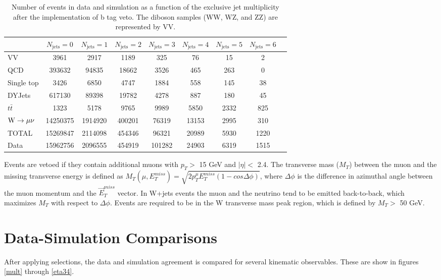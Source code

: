 \documentclass[oneside, letterpaper, oldfontcommands]{memoir}
\begin{document}
\begin{table}\small
\centering
\caption{Number of events in data and simulation as a function of the exclusive jet multiplicity after the implementation of b tag veto. The diboson samples (WW, WZ, and ZZ) are represented by VV.}
\footnotesize{
\begin{tabular}{l|cccccccc}
  &  $N_{\text{jets}} = 0 $ & $N_{\text{jets}} = 1 $ & $N_{\text{jets}} = 2 $ & $N_{\text{jets}} = 3 $ & $N_{\text{jets}} = 4 $ & $N_{\text{jets}} = 5 $ & $N_{\text{jets}} = 6 $ \\ \hline
   VV        & 3961 & 2917 & 1189 & 325 & 76 & 15 & 2 \\
   QCD        & 393632 & 94835 & 18662 & 3526 & 465 & 263 & 0 \\
   Single top        & 3426 & 6850 & 4747 & 1884 & 558 & 145 & 38 \\
   DYJets        & 617130 & 89398 & 19782 & 4278 & 887 & 180 & 45 \\
   $t\bar{t}$         & 1323 & 5178 & 9765 & 9989 & 5850 & 2332 & 825 \\
   $\mathrm{W} \rightarrow \mu\nu$        & 14250375 & 1914920 & 400201 & 76319 & 13153 & 2995 & 310 \\
 \hline
 TOTAL & 15269847 & 2114098 & 454346 & 96321 & 20989 & 5930 & 1220 \\
 \hline
 Data          & 15962756 & 2096555 & 454919 & 101282 & 24903 & 6319 & 1515 \\
 \end{tabular}}
 \label{tab:events}
 \end{table}

\qquad Events are vetoed if they contain additional muons with $p_{T} >$ 15 GeV and $|\eta| <$ 2.4. The transverse mass ($M_{T}$) between the muon and the missing transverse energy is defined as $M_{T}(\mu,E_{T}^{miss}) = \sqrt{2 p_{T}^{\mu} E_{T}^{miss} (1-cos\Delta\phi)}$, where $\Delta\phi$ is the difference in azimuthal angle between the muon momentum and the $\vec{E}_{T}^{miss}$ vector. In W+jets events the muon and the neutrino tend to be emitted back-to-back, which maximizes $M_{T}$ with respect to $\Delta\phi$. Events are required to be in the W transverse mass peak region, which is defined by $M_{T} >$ 50 GeV.

\section{Data-Simulation Comparisons}
\qquad After applying selections, the data and simulation agreement is compared for several kinematic observables. These are show in figures \ref{mult} through \ref{eta34}.
\end{document}
